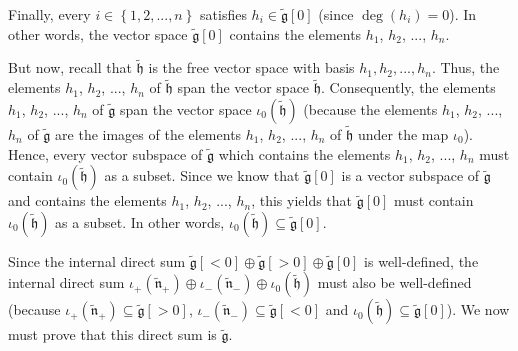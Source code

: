 \documentclass[etingof-lie.tex]{subfiles}
\begin{document}
\begin{verlong}
Finally, every $i\in\left\{  1,2,...,n\right\}  $ satisfies $h_{i}%
\in\widetilde{\mathfrak{g}}\left[  0\right]  $ (since $\deg\left(
h_{i}\right)  =0$). In other words, the vector space $\widetilde{\mathfrak{g}%
}\left[  0\right]  $ contains the elements $h_{1}$, $h_{2}$, $...$, $h_{n}$.

But now, recall that $\widetilde{\mathfrak{h}}$ is the free vector space with
basis $h_{1},h_{2},...,h_{n}$. Thus, the elements $h_{1}$, $h_{2}$, $...$,
$h_{n}$ of $\widetilde{\mathfrak{h}}$ span the vector space
$\widetilde{\mathfrak{h}}$. Consequently, the elements $h_{1}$, $h_{2}$,
$...$, $h_{n}$ of $\widetilde{\mathfrak{g}}$ span the vector space $\iota
_{0}\left(  \widetilde{\mathfrak{h}}\right)  $ (because the elements $h_{1}$,
$h_{2}$, $...$, $h_{n}$ of $\widetilde{\mathfrak{g}}$ are the images of the
elements $h_{1}$, $h_{2}$, $...$, $h_{n}$ of $\widetilde{\mathfrak{h}}$ under
the map $\iota_{0}$). Hence, every vector subspace of $\widetilde{\mathfrak{g}%
}$ which contains the elements $h_{1}$, $h_{2}$, $...$, $h_{n}$ must contain
$\iota_{0}\left(  \widetilde{\mathfrak{h}}\right)  $ as a subset. Since we
know that $\widetilde{\mathfrak{g}}\left[  0\right]  $ is a vector subspace of
$\widetilde{\mathfrak{g}}$ and contains the elements $h_{1}$, $h_{2}$, $...$,
$h_{n}$, this yields that $\widetilde{\mathfrak{g}}\left[  0\right]  $ must
contain $\iota_{0}\left(  \widetilde{\mathfrak{h}}\right)  $ as a subset. In
other words, $\iota_{0}\left(  \widetilde{\mathfrak{h}}\right)  \subseteq
\widetilde{\mathfrak{g}}\left[  0\right]  $.
\end{verlong}

Since the internal direct sum $\widetilde{\mathfrak{g}}\left[  <0\right]
\oplus\widetilde{\mathfrak{g}}\left[  >0\right]  \oplus\widetilde{\mathfrak{g}%
}\left[  0\right]  $ is well-defined, the internal direct sum $\iota
_{+}\left(  \widetilde{\mathfrak{n}}_{+}\right)  \oplus\iota_{-}\left(
\widetilde{\mathfrak{n}}_{-}\right)  \oplus\iota_{0}\left(
\widetilde{\mathfrak{h}}\right)  $ must also be well-defined (because
$\iota_{+}\left(  \widetilde{\mathfrak{n}}_{+}\right)  \subseteq
\widetilde{\mathfrak{g}}\left[  >0\right]  $, $\iota_{-}\left(
\widetilde{\mathfrak{n}}_{-}\right)  \subseteq\widetilde{\mathfrak{g}}\left[
<0\right]  $ and $\iota_{0}\left(  \widetilde{\mathfrak{h}}\right)
\subseteq\widetilde{\mathfrak{g}}\left[  0\right]  $). We now must prove that
this direct sum is $\widetilde{\mathfrak{g}}$.

\bigskip
\end{document}
